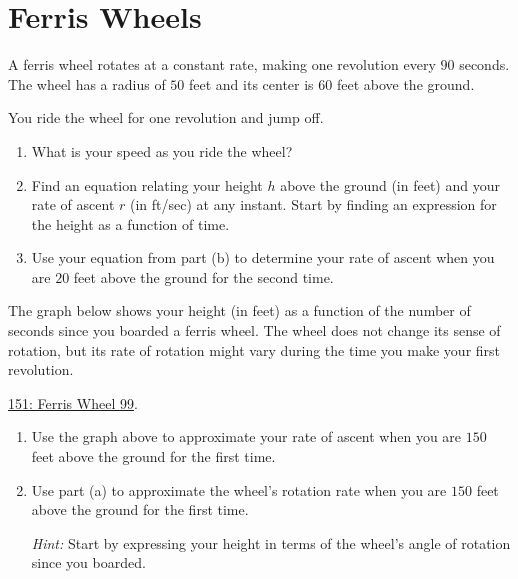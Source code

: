 \documentclass{ximera}
\begin{document}
\section{Ferris Wheels}
\begin{question}  \label{QOERERERERQ}
A ferris wheel rotates at a constant rate, making one revolution every $90$ seconds. The wheel has a radius of $50$ feet and its center is $60$ feet above the ground.

You ride the wheel for one revolution and jump off.

\begin{enumerate}
\item What is your speed as you ride the wheel?

\item Find an equation relating your height $h$ above the ground (in feet) and your rate of ascent $r$ (in ft/sec) at any instant. Start by finding an expression for the height as a function of time. 

\item Use your equation from part (b) to determine your rate of ascent when you are $20$ feet above the ground for the second time.
\end{enumerate}
\end{question}


\begin{question} \label{QsdfPERdfere}
The graph below shows your height (in feet) as a function of the number of seconds since you boarded a ferris wheel. The wheel does not change its sense of rotation, but its rate of rotation might vary during the time you make your first revolution.

\href{https://www.desmos.com/calculator/4y7ljahkwn}{151: Ferris Wheel 99}.

 
\begin{onlineOnly}
    \begin{center}
\end{center}
\end{onlineOnly}

\begin{enumerate}
\item Use the graph above to approximate your rate of ascent when you are $150$ feet above the ground for the first time.

\item Use part (a) to approximate the wheel's rotation rate when you are $150$ feet above the ground for the first time. 

\emph{Hint:} Start by expressing your height in terms of the wheel's angle of rotation since you boarded. 
\end{enumerate}



\end{question}
\end{document}
